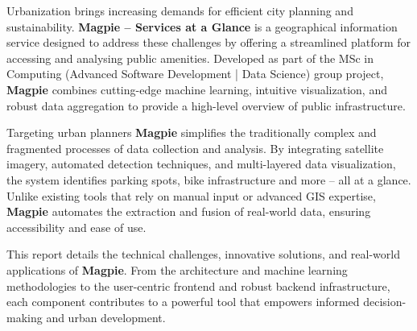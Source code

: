 Urbanization brings increasing demands for efficient city planning and
sustainability. \textbf{Magpie – Services at a Glance} is a geographical
information service designed to address these challenges by offering a
streamlined platform for accessing and analysing public amenities. Developed as
part of the MSc in Computing (Advanced Software Development | Data Science)
group project, \textbf{Magpie} combines cutting-edge machine learning, intuitive
visualization, and robust data aggregation to provide a high-level overview of
public infrastructure.

Targeting urban planners \textbf{Magpie} simplifies the traditionally complex
and fragmented processes of data collection and analysis. By integrating
satellite imagery, automated detection techniques, and multi-layered data
visualization, the system identifies parking spots, bike infrastructure and more
-- all at a glance. Unlike existing tools that rely on manual input or advanced
GIS expertise, \textbf{Magpie} automates the extraction and fusion of real-world
data, ensuring accessibility and ease of use.

This report details the technical challenges, innovative solutions, and
real-world applications of \textbf{Magpie}. From the architecture and machine
learning methodologies to the user-centric frontend and robust backend
infrastructure, each component contributes to a powerful tool that empowers
informed decision-making and urban development.
